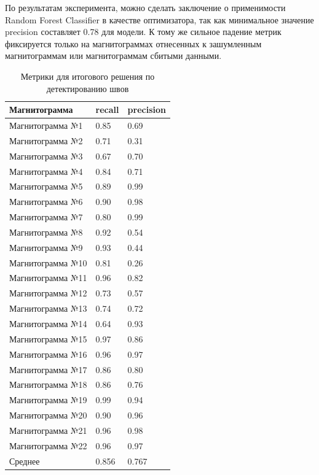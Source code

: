 \documentclass[a4paper,article,14pt]{extarticle}
\begin{document}
По результатам эксперимента, можно сделать заключение о применимости Random Forest Classifier в качестве 
оптимизатора, так как минимальное значение precision составляет 0.78 для модели. К тому же сильное 
падение метрик фиксируется только на магнитограммах отнесенных к зашумленным магнитограммам или 
магнитограммам сбитыми данными.

\begin{center}
    \begin{longtable}{|p{5cm}|p{3cm}|p{3cm}|}
        \caption{Метрики для итогового решения по детектированию швов}\\\hline
        Магнитограмма & recall & precision \\ \hline
        Магнитограмма №1 & 0.85 & 0.69 \\ \hline
        Магнитограмма №2 & 0.71 & 0.31 \\ \hline
        Магнитограмма №3 & 0.67 & 0.70 \\ \hline
        Магнитограмма №4 & 0.84 & 0.71 \\ \hline
        Магнитограмма №5 & 0.89 & 0.99 \\ \hline
        Магнитограмма №6 & 0.90 & 0.98 \\ \hline
        Магнитограмма №7 & 0.80 & 0.99 \\ \hline
        Магнитограмма №8 & 0.92 & 0.54 \\ \hline
        Магнитограмма №9 & 0.93 & 0.44 \\ \hline
        Магнитограмма №10 & 0.81 & 0.26 \\ \hline
        Магнитограмма №11 & 0.96 & 0.82 \\ \hline
        Магнитограмма №12 & 0.73 & 0.57 \\ \hline
        Магнитограмма №13 & 0.74 & 0.72 \\ \hline
        Магнитограмма №14 & 0.64 & 0.93 \\ \hline
        Магнитограмма №15 & 0.97 & 0.86 \\ \hline
        Магнитограмма №16 & 0.96 & 0.97 \\ \hline
        Магнитограмма №17 & 0.86 & 0.80 \\ \hline
        Магнитограмма №18 & 0.86 & 0.76 \\ \hline
        Магнитограмма №19 & 0.99 & 0.94 \\ \hline
        Магнитограмма №20 & 0.90 & 0.96 \\ \hline
        Магнитограмма №21 & 0.96 & 0.98 \\ \hline
        Магнитограмма №22 & 0.96 & 0.97 \\ \hline
        Среднее & 0.856 & 0.767 \\ \hline
    \end{longtable}
\end{center}
\end{document}
